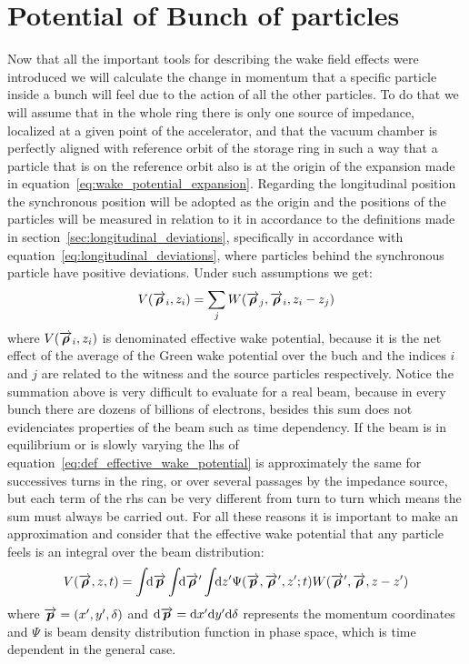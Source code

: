 \section{Potential of Bunch of particles}

    Now that all the important tools for describing the wake field effects were introduced we will calculate the change in momentum that a specific particle inside a bunch will feel due to the action of all the other particles. To do that we will assume that in the whole ring there is only one source of impedance, localized at a given point of the accelerator, and that the vacuum chamber is perfectly aligned with reference orbit of the storage ring in such a way that a particle that is on the reference orbit also is at the origin of the expansion made in equation~\eqref{eq:wake_potential_expansion}. Regarding the longitudinal position the synchronous position will be adopted as the origin and the positions of the particles will be measured in relation to it in accordance to the definitions made in section~\ref{sec:longitudinal_deviations}, specifically in accordance with equation~\ref{eq:longitudinal_deviations}, where particles behind the synchronous particle have positive deviations. Under such assumptions we get:
    \begin{align}\label{eq:def_effective_wake_potential}
  	    V(\overrightarrow{\boldsymbol{\rho}}_i, z_i) = \sum_j W(\overrightarrow{\boldsymbol{\rho}}_j,\overrightarrow{\boldsymbol{\rho}}_i,z_i-z_j)
    \end{align}
    where $V(\overrightarrow{\boldsymbol{\rho}}_i, z_i)$ is denominated effective wake potential, because it is the net effect of the average of the Green wake potential over the buch and the indices $i$ and $j$ are related to the witness and the source particles respectively. Notice the summation above is very difficult to evaluate for a real beam, because in every bunch there are dozens of billions of electrons, besides this sum does not evidenciates properties of the beam such as time dependency. If the beam is in equilibrium or is slowly varying the \gls{lhs} of equation~\ref{eq:def_effective_wake_potential} is approximately the same for successives turns in the ring, or over several passages by the impedance source, but each term of the \gls{rhs} can be very different from turn to turn which means the sum must always be carried out. For all these reasons it is important to make an approximation and consider that the effective wake potential that any particle feels is an integral over the beam distribution:
    \begin{align}\label{eq:int_effective_wake_potential}
  	  	V(\overrightarrow{\boldsymbol{\rho}}, z, t) = \int\!\!\text{d}\overrightarrow{\boldsymbol{p}} \int\!\!\text{d}\overrightarrow{\boldsymbol{\rho}}' \int\!\!\text{d}z' 
	  			\Psi(\overrightarrow{\boldsymbol{p}},\overrightarrow{\boldsymbol{\rho}}',z'; t) W(\overrightarrow{\boldsymbol{\rho}}',\overrightarrow{\boldsymbol{\rho}},z-z')
    \end{align}
    where $\overrightarrow{\boldsymbol{p}} = (x', y', \delta)$ and $\text{d}\overrightarrow{\boldsymbol{p}} = \text{d}x'\text{d}y'\text{d}\delta$ represents the momentum coordinates and $\Psi$ is beam density distribution function in phase space, which is time dependent in the general case.

